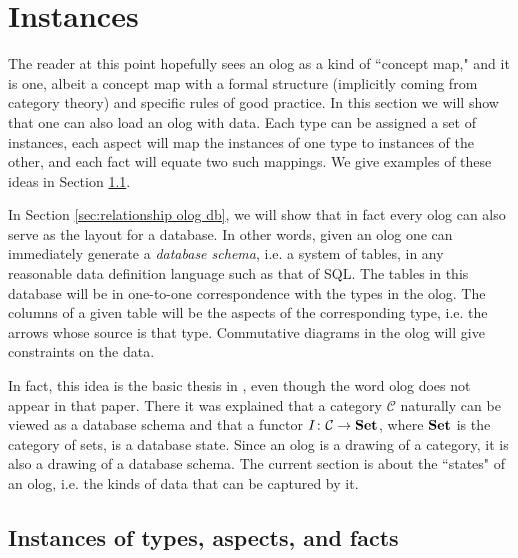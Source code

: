 \documentclass{amsart}
\def\to{\rightarrow}
\def\taking{\colon}
\def\Set{{\bf Set}}
\def\mcC{{\mathcal C}}
\theoremstyle{remark}
\theoremstyle{definition}
\begin{document}

\section{Instances}\label{sec:instances}

The reader at this point hopefully sees an olog as a kind of ``concept map," and it is one, albeit a concept map with a formal structure (implicitly coming from category theory) and specific rules of good practice. In this section we will show that one can also load an olog with data. Each type can be assigned a set of instances, each aspect will map the instances of one type to instances of the other, and each fact will equate two such mappings. We give examples of these ideas in Section \ref{sec:instances of taf}. 

In Section \ref{sec:relationship olog db}, we will show that in fact every olog can also serve as the layout for a database. In other words, given an olog one can immediately generate a {\em database schema}, i.e. a system of tables, in any reasonable data definition language such as that of SQL. The tables in this database will be in one-to-one correspondence with the types in the olog. The columns of a given table will be the aspects of the corresponding type, i.e. the arrows whose source is that type. Commutative diagrams in the olog will give constraints on the data.

In fact, this idea is the basic thesis in \cite{Spi-FDM}, even though the word olog does not appear in that paper. There it was explained that a category $\mcC$ naturally can be viewed as a database schema and that a functor $I\taking\mcC\to\Set$, where $\Set$ is the category of sets, is a database state. Since an olog is a drawing of a category, it is also a drawing of a database schema. The current section is about the ``states" of an olog, i.e. the kinds of data that can be captured by it. 

\subsection{Instances of types, aspects, and facts}\label{sec:instances of taf}
\end{document}
